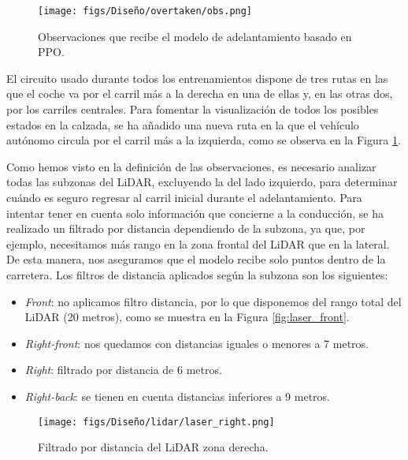 \begin{figure}[ht]
\centering
\texttt{[image: figs/Diseño/overtaken/obs.png]}
\caption{Observaciones que recibe el modelo de adelantamiento basado en \ac{PPO}.}
\label{fig:obs_overtaken}
\end{figure}

El circuito usado durante todos los entrenamientos dispone de tres rutas en las que el coche va por el carril más a la derecha en una de ellas y, en las otras dos, por los carriles centrales. Para fomentar la visualización de todos los posibles estados en la calzada, se ha añadido una nueva ruta en la que el vehículo autónomo circula por el carril más a la izquierda, como se observa en la Figura \ref{fig:obs_overtaken}.

Como hemos visto en la definición de las observaciones, es necesario analizar todas las subzonas del \ac{LiDAR}, excluyendo la del lado izquierdo, para determinar cuándo es seguro regresar al carril inicial durante el adelantamiento. Para intentar tener en cuenta solo información que concierne a la conducción, se ha realizado un filtrado por distancia dependiendo de la subzona, ya que, por ejemplo, necesitamos más rango en la zona frontal del \ac{LiDAR} que en la lateral. De esta manera, nos aseguramos que el modelo recibe solo puntos dentro de la carretera. Los filtros de distancia aplicados según la subzona son los siguientes:
\begin{itemize}
\item \textit{Front}: no aplicamos filtro distancia, por lo que disponemos del rango total del \ac{LiDAR} (20 metros), como se muestra en la Figura \ref{fig:laser_front}.
\item \textit{Right-front}: nos quedamos con distancias iguales o menores a 7 metros.
\item \textit{Right}: filtrado por distancia de 6 metros.
\item \textit{Right-back}: se tienen en cuenta distancias inferiores a 9 metros.
\end{itemize}

\begin{figure}[ht]
\centering
\texttt{[image: figs/Diseño/lidar/laser\_right.png]}
\caption{Filtrado por distancia del \ac{LiDAR} zona derecha.}
\label{fig:laser_right}
\end{figure}

